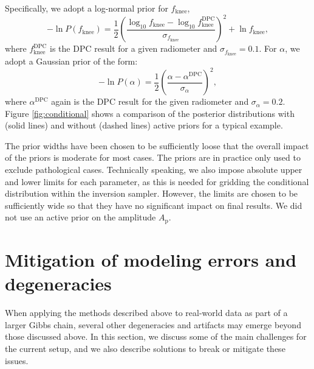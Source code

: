 \documentclass{aa}
\begin{document}
Specifically, we adopt a log-normal prior for $f_\mathrm{knee}$,
\begin{equation}\label{eq:fknee_prior}
        -\ln P(f_\mathrm{knee}) =  \frac{1}{2}\left(\frac{\log_{10} f_\mathrm{knee}  - \log_{10} f^\mathrm{DPC}_\mathrm{knee} }{\sigma_{f_\mathrm{knee}}}\right)^2 + \ln f_\mathrm{knee},
\end{equation}
where $f^\mathrm{DPC}_\mathrm{knee}$ is the DPC result for a given
radiometer \citep{planck2016-l02} and $\sigma_{f_\mathrm{knee}} = 0.1$. For $\alpha$, we
adopt a Gaussian prior of the form:
\begin{equation}\label{eq:alpha_prior}
        -\ln P(\alpha) =  \frac{1}{2}\left(\frac{\alpha  - \alpha^\mathrm{DPC}}{\sigma_\alpha}\right)^2,
\end{equation}
where $\alpha^\mathrm{DPC}$ again is the DPC result for the given
radiometer and $\sigma_\alpha = 0.2$. 
Figure \ref{fig:conditional} shows a comparison of the posterior
distributions with (solid lines) and without (dashed lines) active
priors for a typical example.

The prior widths have been chosen to be
sufficiently loose that the overall impact of the priors is moderate
for most cases. The priors are in practice only used to exclude
pathological cases. Technically speaking, we also
impose absolute upper and lower limits for each parameter, as this is
needed for gridding the conditional distribution within the inversion
sampler. However, the limits are chosen to be sufficiently wide so that they have no
significant impact on final results. We did not use an active prior on the amplitude $A_\mathrm{p}$. 



\section{Mitigation of modeling errors and degeneracies}
\label{sec:degeneracies}

When applying the methods described above to real-world data as part
of a larger Gibbs chain, several other degeneracies and artifacts may
emerge beyond those discussed above. In this section, we discuss some
of the main challenges for the current setup, and we also describe
solutions to break or mitigate these issues.
\end{document}
